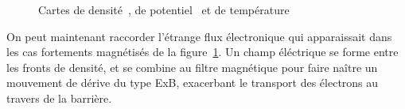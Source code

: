 \begin{refsection}
	\begin{figure}[htbp]
  \centering
    \caption{Cartes de densité~, de
    potentiel~ et de
    température}
    \label{4-PegasesCarteDensiteVarBiasWave}
\end{figure}

On peut maintenant raccorder l'étrange flux électronique qui apparaissait dans
les cas fortements magnétisés de la
figure~\ref{4-PegasesCarteDensiteVarBiasWave}. Un champ éléctrique se forme
entre les fronts de densité, et se combine au filtre
magnétique pour faire naître un mouvement de dérive du type ExB, exacerbant le
transport des électrons au travers de la barrière. 


\end{refsection}

